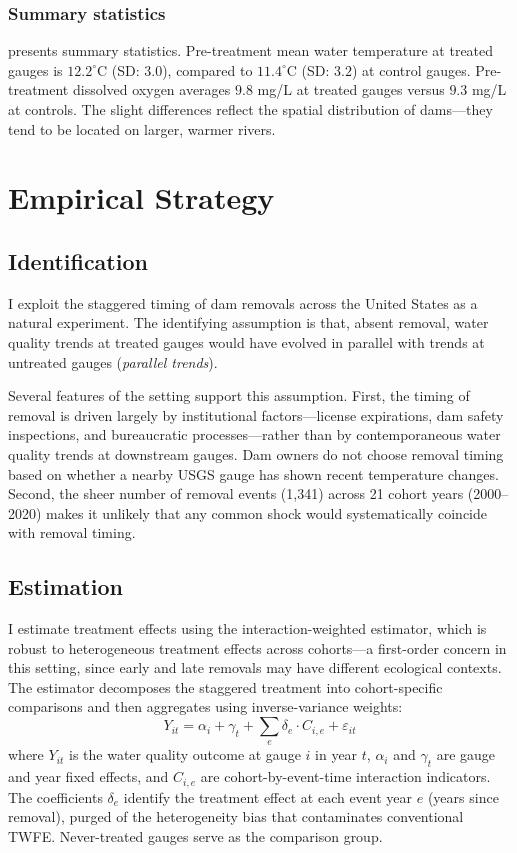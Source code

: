 \documentclass[12pt]{article}
\begin{document}
\subsubsection*{Summary statistics}  presents summary statistics. Pre-treatment mean water temperature at treated gauges is $12.2^{\circ}$C (SD: $3.0$), compared to $11.4^{\circ}$C (SD: $3.2$) at control gauges. Pre-treatment dissolved oxygen averages $9.8$ mg/L at treated gauges versus $9.3$ mg/L at controls. The slight differences reflect the spatial distribution of dams---they tend to be located on larger, warmer rivers.



\section{Empirical Strategy}

\subsection{Identification}

I exploit the staggered timing of dam removals across the United States as a natural experiment. The identifying assumption is that, absent removal, water quality trends at treated gauges would have evolved in parallel with trends at untreated gauges (\textit{parallel trends}).

Several features of the setting support this assumption. First, the timing of removal is driven largely by institutional factors---license expirations, dam safety inspections, and bureaucratic processes---rather than by contemporaneous water quality trends at downstream gauges. Dam owners do not choose removal timing based on whether a nearby USGS gauge has shown recent temperature changes. Second, the sheer number of removal events (1,341) across 21 cohort years (2000--2020) makes it unlikely that any common shock would systematically coincide with removal timing.

\subsection{Estimation}

I estimate treatment effects using the \citet{sunab2021} interaction-weighted estimator, which is robust to heterogeneous treatment effects across cohorts---a first-order concern in this setting, since early and late removals may have different ecological contexts. The estimator decomposes the staggered treatment into cohort-specific comparisons and then aggregates using inverse-variance weights:
\begin{equation}
Y_{it} = \alpha_i + \gamma_t + \sum_{e} \delta_e \cdot C_{i,e} + \varepsilon_{it}
\end{equation}
where $Y_{it}$ is the water quality outcome at gauge $i$ in year $t$, $\alpha_i$ and $\gamma_t$ are gauge and year fixed effects, and $C_{i,e}$ are cohort-by-event-time interaction indicators. The coefficients $\delta_e$ identify the treatment effect at each event year $e$ (years since removal), purged of the heterogeneity bias that contaminates conventional TWFE. Never-treated gauges serve as the comparison group.
\end{document}

